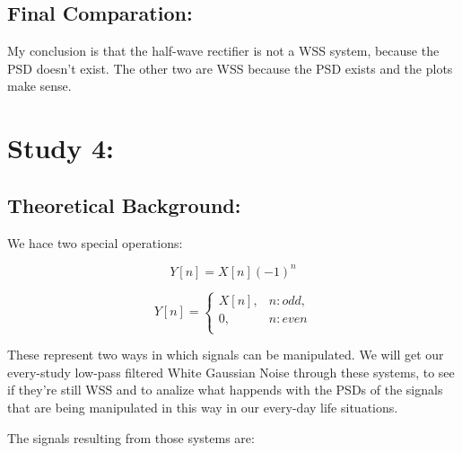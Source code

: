 \documentclass[a4paper,11pt]{article}
\begin{document}
\newpage

\subsection{Final Comparation:}

My conclusion is that the half-wave rectifier is not a WSS system, because the PSD doesn't exist. The other two are WSS because the PSD exists and the plots make sense.

\newpage

\section{Study 4:}

\subsection{Theoretical Background:}

We hace two special operations:

\begin{equation}
  Y[n] = X[n](-1)^n
\end{equation}

\begin{equation}
  Y[n] =
    \begin{cases}
        X[n],& n: odd,\\
        0,    & n: even\\
    \end{cases}
\end{equation}

These represent two ways in which signals can be manipulated. We will get our every-study low-pass filtered White Gaussian Noise through these systems, to see if they're still WSS and to analize what happends with the PSDs of the signals that are being manipulated in this way in our every-day life situations.

The signals resulting from those systems are:
\end{document}
